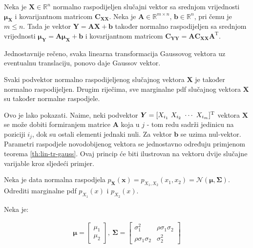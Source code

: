 \begin{theorem}
	\label{th:lin-tr-gauss}
	Neka je $\bm X \in \mathbb{R}^n$ normalno raspodijeljen slučajni vektor sa
	srednjom vrijednosti $\bm\mu_{\bm X}$ i kovarijantnom matricom $\bm C_{\bm
	X\bm X}$. Neka je $\bm A \in \mathbb{R}^{m\times n}$, $\bm b \in
	\mathbb{R}^n$, pri čemu je $m\le n$. Tada je vektor $\bm Y = \bm A \bm X + \bm
	b$ također normalno raspodijeljen sa srednjom vrijednosti $\bm\mu_{\bm Y} =
	\bm A\bm\mu_{\bm X} + \bm b$ i kovarijantnom matricom $\bm C_{\bm Y\bm Y} =
	\bm A \bm C_{\bm X\bm X} \bm A^\mathrm T$.

\end{theorem}

Jednostavnije rečeno, svaka linearna transformacija Gaussovog vektora uz
eventualnu translaciju, ponovo daje Gaussov vektor.

\begin{corollary}
	Svaki podvektor normalno raspodijeljenog slučajnog vektora $\bm X$ je također
	normalno raspodijeljen. Drugim riječima, sve marginalne pdf slučajnog
	vektora $\bm X$ su također normalne raspodjele.
\end{corollary}

Ovo je lako pokazati. Naime, neki podvektor $\bm Y = [X_{i_1}\ X_{i_2}\ \cdots\
X_{i_m}]^\text T$ vektora $\bm X$ se može dobiti formiranjem matrice $\bm A$
koja u $j$ - tom redu sadrži jedinicu na poziciji $i_j$, dok su ostali elementi
jednaki nuli. Za vektor $\bm b$ se uzima nul-vektor.  Parametri raspodjele
novodobijenog vektora se jednostavno određuju primjenom teorema
\ref{th:lin-tr-gauss}. Ovaj princip će biti ilustrovan na vektoru dvije slučajne
varijable kroz sljedeći primjer.

\begin{exmp}
	Neka je data normalna raspodjela $p_{\bm X}(\bm x) = p_{X_1,X_2}(x_1, x_2) =
	\mathcal{N}(\bm\mu, \bm \Sigma)$. Odrediti marginalne pdf $p_{X_1}(x)$ i
	$p_{X_2}(x)$.
\end{exmp}

Neka je:

\begin{eqnarray} \label{eq:kovarijansa-2d}
	\bm\mu = \left[\begin{array}{c}
		\mu_1 \\ \mu_2
	\end{array}\right],\ 
	\bm\Sigma = \left[\begin{array}{cc}
	  \sigma_1^2 & \rho\sigma_1\sigma_2 \\  \rho\sigma_1\sigma_2 & \sigma_2^2
	\end{array}\right]
\end{eqnarray}

